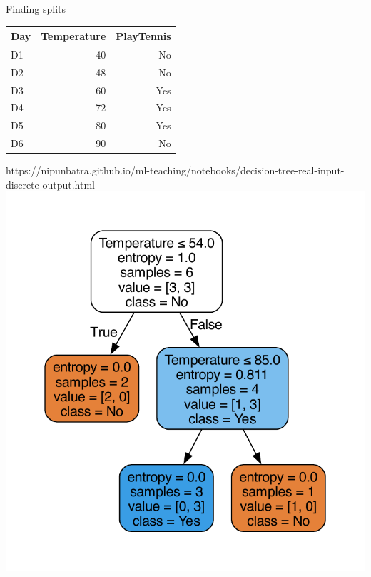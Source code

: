 \documentclass[usenames,dvipsnames]{beamer}
\begin{document}
    \begin{frame}{Finding splits}
        \begin{table}[]
            \begin{tabular}{@{}lrr@{}}
                \toprule
                \textbf{Day} & \textbf{Temperature} & \textbf{PlayTennis} \\ \midrule
                D1           & 40                   & No                  \\
                D2           & 48                   & No                  \\
                D3           & 60                   & Yes                 \\
                D4           & 72                   & Yes                 \\
                D5           & 80                   & Yes                 \\
                D6           & 90                   & No                  \\ \bottomrule
            \end{tabular}
        \end{table}
        \begin{notebookbox}{https://nipunbatra.github.io/ml-teaching/notebooks/decision-tree-real-input-discrete-output.html}
            \includegraphics[scale=0.25]{../assets/decision-trees/figures/real-ip-2.pdf}
        \end{notebookbox}
        \end{frame}
\end{document}
